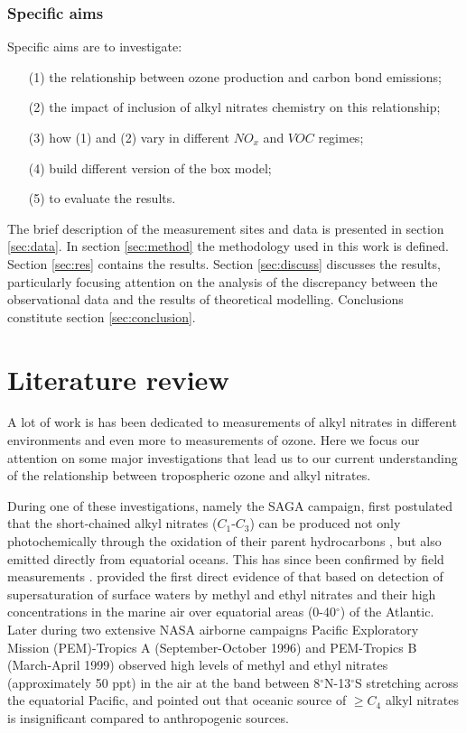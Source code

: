 \documentclass[11pt,a4paper]{article}
\begin{document}
\subsubsection*{Specific aims}\label{sec:objams_ams}
Specific aims are to investigate:
\begin{itemize}
\item[(1)] the relationship between ozone production and carbon bond emissions;
\item[(2)] the impact of inclusion of alkyl nitrates chemistry on this relationship;
\item[(3)] how (1) and (2) vary in different $NO_x$ and $VOC$ regimes;
\item[(4)] build different version of the box model;
\item[(5)] to evaluate the results.
\end{itemize}

The brief description of the measurement sites and data is presented in section \ref{sec:data}. In section \ref{sec:method} the methodology used in this work is defined. Section \ref{sec:res} contains the results. Section \ref{sec:discuss} discusses the results, particularly focusing attention on the analysis of the discrepancy between the observational data and the results of theoretical modelling. Conclusions constitute section \ref{sec:conclusion}.

\section{Literature review} \label{sec:lit_review}
A lot of work is has been dedicated to measurements of alkyl nitrates in different environments and even more to measurements of ozone. Here we focus our attention on some major investigations that lead us to our current understanding of the relationship between tropospheric ozone and alkyl nitrates.

During one of these investigations, namely the SAGA campaign, \citep{Atlas1993} first postulated that the short-chained alkyl nitrates ($C_1$-$C_3$) can be produced not only photochemically through the oxidation of their parent hydrocarbons \citep{Roberts1990}, but also emitted directly from equatorial oceans. This has since been confirmed by field measurements \citep{Chuck2002,Blake2003,Dahl2005}. \citep{Chuck2002} provided the first direct evidence of that based on detection of supersaturation of surface waters by methyl and ethyl nitrates and their high concentrations in the marine air over equatorial areas (0-40$^{\circ}$) of the Atlantic. Later during two extensive NASA airborne campaigns Pacific Exploratory Mission (PEM)-Tropics A (September-October 1996) and PEM-Tropics B (March-April 1999) \citep{Blake2003} observed high levels of methyl and ethyl nitrates (approximately 50 ppt) in the air at the band between 8$^{\circ}$N-13$^{\circ}$S stretching across the equatorial Pacific, and pointed out that oceanic source of $\geq C_4$ alkyl nitrates is insignificant compared to anthropogenic sources.
\end{document}
